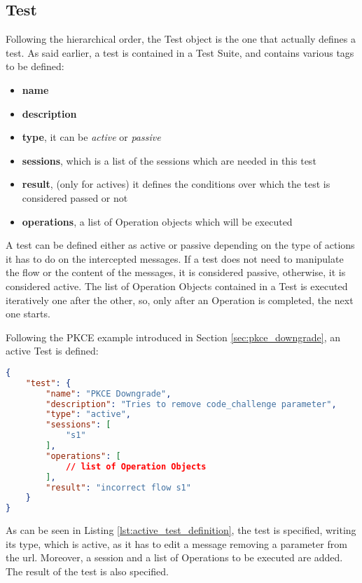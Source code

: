 \subsection{Test}
Following the hierarchical order, the Test object is the one that actually defines a test. As said earlier, a test is contained in a Test Suite, and contains various tags to be defined:
\begin{itemize}
    \item \textbf{name}
    \item \textbf{description}
    \item \textbf{type}, it can be \textit{active} or \textit{passive}
    \item \textbf{sessions}, which is a list of the sessions which are needed in this test
    \item \textbf{result}, (only for actives) it defines the conditions over which the test is considered passed or not
    \item \textbf{operations}, a list of Operation objects which will be executed
\end{itemize}
A test can be defined either as active or passive depending on the type of actions it has to do on the intercepted messages. If a test does not need to manipulate the flow or the content of the messages, it is considered passive, otherwise, it is considered active.
The list of Operation Objects contained in a Test is executed iteratively one after the other, so, only after an Operation is completed, the next one starts.

Following the \gls{PKCE} example introduced in Section \ref{sec:pkce_downgrade}, an active Test is defined:

\begin{lstlisting}[language=json, caption=Active test definition, label={lst:active_test_definition}]
{
    "test": {
        "name": "PKCE Downgrade",
        "description": "Tries to remove code_challenge parameter",
        "type": "active",
        "sessions": [
            "s1"
        ],
        "operations": [
            // list of Operation Objects
        ],
        "result": "incorrect flow s1"
    }
}    
\end{lstlisting}

As can be seen in Listing \ref{lst:active_test_definition}, the test is specified, writing its type, which is active, as it has to edit a message removing a parameter from the url. Moreover, a session and a list of Operations to be executed are added. The result of the test is also specified.

